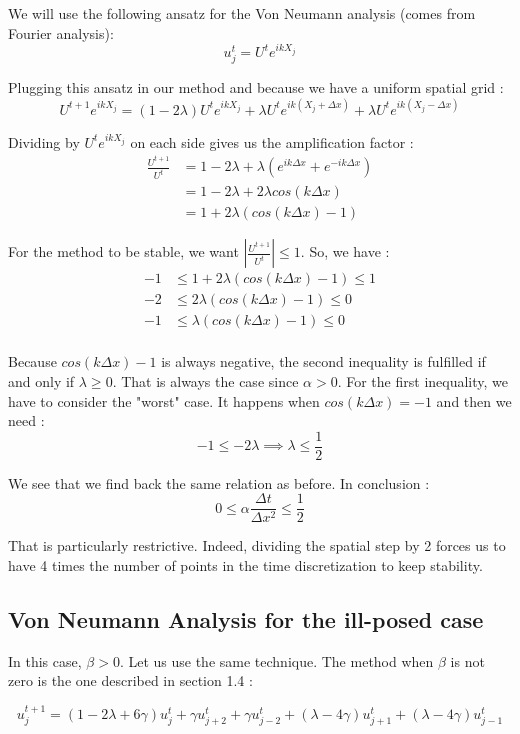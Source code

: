 We will use the following ansatz for the Von Neumann analysis (comes from Fourier analysis):
$$u_j^t = U^te^{ikX_j}$$

Plugging this ansatz in our method and because we have a uniform spatial grid : 
$$U^{t+1}e^{ikX_j} = (1-2\lambda)U^te^{ikX_j} + \lambda U^t e^{ik(X_j+\Delta x)}+ \lambda U^t e^{ik(X_j-\Delta x)}$$

Dividing by $U^t e^{ikX_j}$ on each side gives us the amplification factor :
\begin{align*}
\frac{U^{t+1}}{U^t} &= 1-2\lambda + \lambda (e^{ik\Delta x} + e^{-ik\Delta x})\\
&= 1-2\lambda +2\lambda cos(k\Delta x)\\
&= 1 + 2\lambda (cos(k\Delta x) -1)
\end{align*}

For the method to be stable, we want $|\frac{U^{t+1}}{U^t}| \leq 1$. So, we have :
\begin{align*}
-1 &\leq 1 + 2\lambda (cos(k\Delta x) -1) \leq 1\\
-2 &\leq 2\lambda (cos(k\Delta x) -1) \leq 0\\
-1 &\leq \lambda (cos(k\Delta x) -1) \leq 0\\
\end{align*}

Because $cos(k\Delta x) -1$ is always negative, the second inequality is fulfilled if and only if $\lambda \geq 0$. That is always the case since $\alpha >0$. For the first inequality, we have to consider the "worst" case. It happens when $cos(k\Delta x) = -1$ and then we need : 
$$-1 \leq -2 \lambda \implies \lambda \leq \frac{1}{2} $$

We see that we find back the same relation as before. In conclusion : 
$$0 \leq \alpha \frac{\Delta t }{\Delta x^2} \leq \frac{1}{2}$$

That is particularly restrictive. Indeed, dividing the spatial step by 2 forces us to have 4 times the number of points in the time discretization to keep stability.

\subsection{Von Neumann Analysis for the ill-posed case}
In this case, $\beta > 0$. Let us use the same technique. The method when $\beta$ is not zero is the one described in section 1.4 : 

$$u_j^{t+1} = (1-2\lambda+6\gamma)u_j^t + \gamma u_{j+2}^t + \gamma u_{j-2}^t + (\lambda - 4\gamma)u_{j+1}^t + (\lambda - 4\gamma)u_{j-1}^t$$


